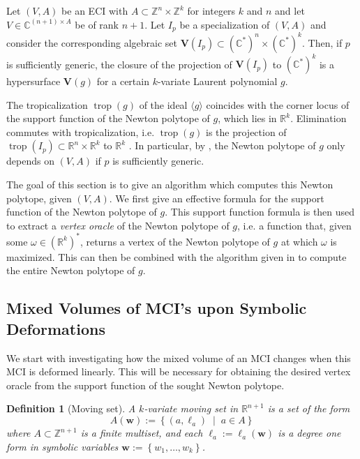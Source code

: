 \documentclass[a4paper]{article}
\newtheorem{definition}{Definition}
\theoremstyle{remark}
\newcommand{\set}[1]{\left\{#1\right\}}
\newcommand{\setdes}[2]{\left\{#1\;\middle|\;#2\right\}}
\def\Var{\mathbf{V}}
\def\RR{\mathbb{R}}
\def\CC{\mathbb{C}}
\def\ZZ{\mathbb{Z}}
\def\ww{\mathbf{w}}
\DeclareMathOperator{\trop}{trop}
\begin{document}
Let $(V,A)$ be an ECI with $A\subset \ZZ^n\times \ZZ^{k}$ for integers
$k$ and $n$ and let $V\in \CC^{(n+1) \times A}$ be of rank $n + 1$. Let
$I_p$ be a specialization of $(V,A)$ and consider the
corresponding algebraic set
$\Var(I_p)\subset (\CC^{*})^n\times (\CC^{*})^{k}$. Then, if $p$ is
sufficiently generic, the closure of the projection of $\Var(I_p)$ to
$(\CC^{*})^{k}$ is a hypersurface $\Var(g)$ for a certain
$k$-variate Laurent polynomial $g$.

The tropicalization $\trop(g)$ of the ideal $\langle g \rangle$ coincides with the
corner locus of the support function of the Newton polytope of $g$,
which lies in $\RR^{k}$. Elimination commutes with tropicalization,
i.e. $\trop(g)$ is the projection of
$\trop(I_p)\subset \RR^n\times \RR^{k}$ to $\RR^{k}$ \cite[see
e.g.][]{sturmfels2008}. In particular, by , the
Newton polytope of $g$ only depends on $(V, A)$ if $p$ is sufficiently
generic.

The goal of this section is to give an algorithm which computes this
Newton polytope, given $(V, A)$. We first give an effective formula
for the support function of the Newton polytope of $g$. This support
function formula is then used to extract a {\em vertex oracle} of the
Newton polytope of $g$, i.e. a function that, given some
$\omega\in (\RR^k)^{*}$, returns a vertex of the Newton polytope of
$g$ at which $\omega$ is maximized. This can then be combined with the
algorithm given in \cite{hugginsIB4eSoftwareFramework2006} to compute
the entire Newton polytope of $g$.

\subsection{Mixed Volumes of MCI's upon Symbolic Deformations}
\label{sec:deform}

We start with investigating how the mixed volume of an MCI changes
when this MCI is deformed linearly. This will be necessary for
obtaining the desired vertex oracle from the support function of the
sought Newton polytope.

\begin{definition}[Moving set]
  A \textit{$k$-variate moving set} in $\RR^{n+1}$ is a set of the form
  \[A(\ww) := \setdes{(a, \ell_a)}{a\in A}\] where
  $A\subset \ZZ^{n+1}$ is a finite multiset, and each
  $\ell_a := \ell_a(\mathbf{w})$ is a degree one form in symbolic variables
  $\mathbf{w} := \set{w_1,\dots,w_k}$.
\end{definition}
\end{document}
